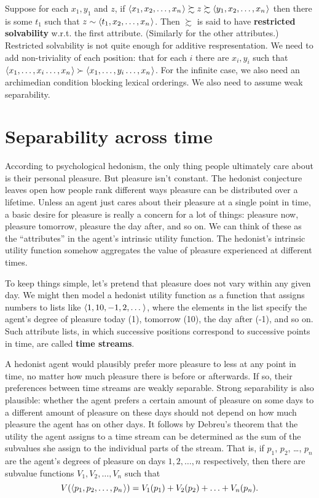 {  Suppose for each $x_1,y_1$ and $z$, if
  $\t{x_1,x_2,\ldots,x_n} \succsim z \succsim \t{y_1,x_2,\ldots,x_n}$ then there
  is some $t_1$ such that $z \sim \t{t_1, x_2,\ldots, x_n}$. Then $\succsim$ is
  said to have \textbf{restricted solvability} w.r.t. the first attribute.
  (Similarly for the other attributes.) Restricted solvability is not quite
  enough for additive respresentation. We need to add non-triviality of each
  position: that for each $i$ there are $x_i, y_i$ such that
  $\t{x_1,\ldots,x_i\ldots,x_n} \succ \t{x_1,\ldots,y_i\ldots,x_n}$. For the
  infinite case, we also need an archimedian condition blocking lexical
  orderings. We also need to assume weak separability.

} %


\section{Separability across time}\label{sec:separability-time}

According to psychological hedonism, the only thing people ultimately care about
is their personal pleasure. But pleasure isn't constant. The hedonist conjecture
leaves open how people rank different ways pleasure can be distributed over a
lifetime. Unless an agent just cares about their pleasure at a single point in
time, a basic desire for pleasure is really a concern for a lot of things:
pleasure now, pleasure tomorrow, pleasure the day after, and so on. We can think
of these as the ``attributes'' in the agent's intrinsic utility function. The
hedonist's intrinsic utility function somehow aggregates the value of pleasure
experienced at different times.

To keep things simple, let's pretend that pleasure does not vary within any
given day. We might then model a hedonist utility function as a function that
assigns numbers to lists like $\t{1,10,-1,2,\ldots}$, where the elements in the
list specify the agent's degree of pleasure today (1), tomorrow (10), the day
after (-1), and so on. Such attribute lists, in which successive positions
correspond to successive points in time, are called \textbf{time streams}.

A hedonist agent would plausibly prefer more pleasure to less at any point in
time, no matter how much pleasure there is before or afterwards. If so, their
preferences between time streams are weakly separable. Strong separability is
also plausible: whether the agent prefers a certain amount of pleasure on some
days to a different amount of pleasure on these days should not depend on how
much pleasure the agent has on other days. It follows by Debreu's theorem that
the utility the agent assigns to a time stream can be determined as the sum of the
subvalues she assign to the individual parts of the stream. That is, if $p_1$,
$p_2$, \ldots, $p_n$ are the agent's degrees of pleasure on days
$1, 2, \ldots, n$ respectively, then there are subvalue functions
$V_1,V_2,\ldots,V_n$ such that
\[
V(\t{p_1,p_2,\ldots,p_n}) = V_1(p_1) + V_2(p_2) + \ldots + V_n(p_n).
\]

